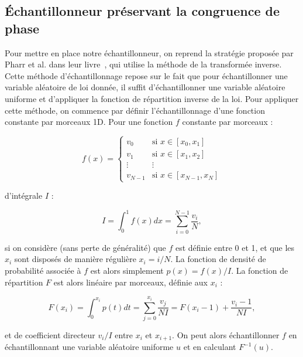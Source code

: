 \subsection{Échantillonneur préservant la congruence de phase}

Pour mettre en place notre échantillonneur, on reprend la stratégie proposée par Pharr et al. dans leur livre~\cite{pharr_physically_2023}, qui utilise la méthode de la transformée inverse. Cette méthode d'échantillonnage repose sur le fait que pour échantillonner une variable aléatoire de loi donnée, il suffit d'échantillonner une variable aléatoire uniforme et d'appliquer la fonction de répartition inverse de la loi. Pour appliquer cette méthode, on commence par définir l'échantillonnage d'une fonction constante par morceaux 1D. Pour une fonction $f$ constante par morceaux :


\begin{equation}
    f(x) = \left\{
        \begin{array}{ll}
            v_0 & \mbox{si } x \in [x_0, x_1] \\
            v_1 & \mbox{si } x \in [x_1, x_2] \\
            \vdots & \vdots \\
            v_{N-1} & \mbox{si } x \in [x_{N-1}, x_N]
        \end{array}
    \right.
\end{equation}

d'intégrale $I$ :

\begin{equation}
    I = \int_{0}^{1} f(x) dx = \sum_{i=0}^{N-1} \frac{v_i}N,
\end{equation}

si on considère (sans perte de généralité) que $f$ est définie entre 0 et 1, et que les $x_i$ sont disposés de manière régulière $x_i = i / N$. La fonction de densité de probabilité associée à $f$ est alors simplement $p(x) = f(x) / I$. La fonction de répartition $F$ est alors linéaire par morceaux, définie aux $x_i$ :

\begin{equation}
    F(x_i) = \int_{0}^{x_i} p(t) dt = \sum_{j=0}^{x_i} \frac{v_j}{NI} = F(x_i-1) + \frac{v_i-1}{NI},
\end{equation}

et de coefficient directeur $v_i/I$ entre $x_i$ et $x_{i+1}$. On peut alors échantillonner $f$ en échantillonnant une variable aléatoire uniforme $u$ et en calculant $F^{-1}(u)$.

